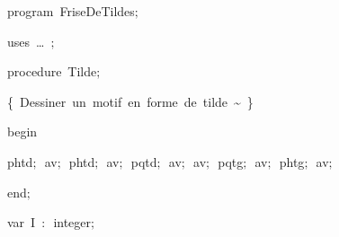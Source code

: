 
{
\parindent {}
\medskip

\carrenoir
\vspace{\neglskip}\mbox{\blc  \idt  \mcl program\idt \ FriseDeTildes$;$
}\par 
\vspace{\neglskip}\mbox{\blc \blk\idt \mcl uses\idt \ \ldots\ $;$
}\par 
\medskip

\pagebreak[3] 
\vspace{\neglskip}\mbox{\blc  \blk\idt  \mcl procedure\idt \ Tilde$;$}\par 
\vspace{\neglskip}\mbox{\blc  \blk\blk\idt  \cmt  \{\ Dessiner\ un\ motif\ en\ forme\ de\ tilde\ \~{ }\ \}\idt }\par 
\vspace{\neglskip}\mbox{\blc  \blk\idt  \mcl begin\idt }\par 
\vspace{\neglskip}\mbox{\blc  \blk\blk\idt  phtd$;$\ av$;$\ phtd$;$\ av$;$\ pqtd$;$\ av$;$\ av$;$\ pqtg$;$\ av$;$\ phtg$;$\ av$;$}\par 
\vspace{\neglskip}\mbox{\blc  \blk\idt  \mcl end\idt $;$}\par 
\medskip

\pagebreak[3] 
\vspace{\neglskip}\mbox{\blc  \blk\idt  \mcl var\idt \ I\ $:$\ integer$;$}\par 
\medskip

}
